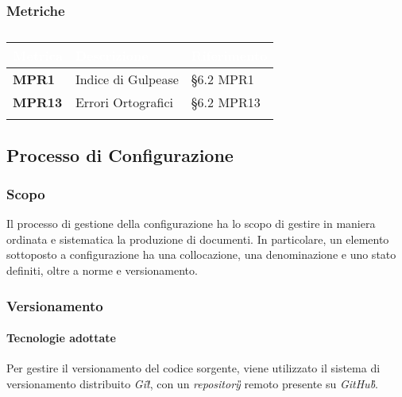 			\subsubsection{Metriche}
			\setlength{\freewidth}{\dimexpr\textwidth-0\tabcolsep}
			\renewcommand{\arraystretch}{1.5}
			\setlength{\aboverulesep}{0pt}
			\setlength{\belowrulesep}{0pt}
			\begin{longtable}{L{.22\freewidth} L{.4\freewidth} L{.2\freewidth}}
				\toprule
				\textcolor{white}{\textbf{Metrica}}&
				\textcolor{white}{\textbf{Descrizione}}&	
				\textcolor{white}{\textbf{Riferimento}}\\
				\toprule
				\endhead
				
				\textbf{MPR1} & Indice di Gulpease & \S 6.2 MPR1 \\
				\textbf{MPR13} & Errori Ortografici & \S 6.2 MPR13 \\

				\bottomrule
				\caption*{}
			\end{longtable}
			
	\subsection{Processo di Configurazione}
	\subsubsection{Scopo}
		Il processo di gestione della configurazione ha lo scopo di gestire in maniera ordinata e sistematica la produzione di documenti. %
		 In particolare, un elemento sottoposto a configurazione ha una collocazione, una denominazione e uno stato definiti, oltre a norme e versionamento. 
 	
	\subsubsection{Versionamento}
		\paragraph*{Tecnologie adottate}
		\aCapo{}  
			Per gestire il versionamento del codice sorgente, viene utilizzato il sistema di versionamento distribuito \emph{Git\G}, con un \emph{repository\G{}} remoto presente su \emph{GitHub\G}.
			
